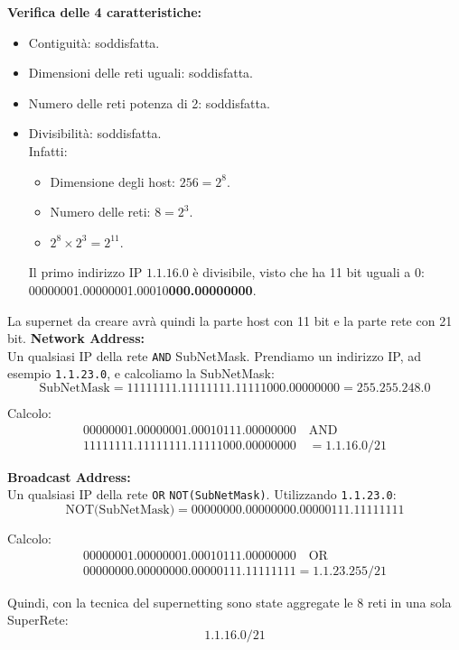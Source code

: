 \documentclass[12pt]{report}
\begin{document}
\begin{tcolorbox}[breakable, title={Esempio di Supernetting}]
	\textbf{Verifica delle 4 caratteristiche:}
	\begin{itemize}
		\item Contiguità: soddisfatta.
		\item Dimensioni delle reti uguali: soddisfatta.
		\item Numero delle reti potenza di 2: soddisfatta.
		\item Divisibilità: soddisfatta.\\
		Infatti:
		\begin{itemize}
			\item Dimensione degli host: $256=2^8$.
			\item Numero delle reti: $8=2^3$.
			\item $2^8 \times 2^3 = 2^{11}$.
		\end{itemize}
		Il primo indirizzo IP $1.1.16.0$ è divisibile, visto che ha 11 bit uguali a 0: 00000001.00000001.00010\textbf{000.00000000}.
	\end{itemize}
	La supernet da creare avrà quindi la parte host con 11 bit e la parte rete con 21 bit.
	\textbf{Network Address:}\\
	Un qualsiasi IP della rete \texttt{AND} SubNetMask. Prendiamo un indirizzo IP, ad esempio \texttt{1.1.23.0}, e calcoliamo la SubNetMask:
	\[
	\text{SubNetMask} = 11111111.11111111.11111000.00000000 = 255.255.248.0
	\]
	
	Calcolo:
	\[
	\begin{array}{l}
		00000001.00000001.00010111.00000000 \quad \text{AND} \\11111111.11111111.11111000.00000000 \quad = 1.1.16.0/21
	\end{array}
	\]
	
	\textbf{Broadcast Address:}\\
	Un qualsiasi IP della rete \texttt{OR} \texttt{NOT(SubNetMask)}. Utilizzando \texttt{1.1.23.0}:
	\[
	\text{NOT(SubNetMask)} = 00000000.00000000.00000111.11111111
	\]
	
	Calcolo:
	\[
	\begin{array}{l}
		00000001.00000001.00010111.00000000 \quad \text{OR} \\ 00000000.00000000.00000111.11111111 = 1.1.23.255/21
	\end{array}
	\]
	
	Quindi, con la tecnica del supernetting sono state aggregate le 8 reti in una sola SuperRete:
	\[
	1.1.16.0/21
	\]
\end{tcolorbox}
\end{document}
